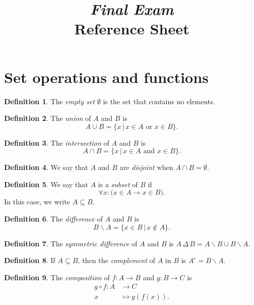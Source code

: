 \documentclass{article}
\title{\emph{\Large Final Exam} \\ Reference Sheet}
\author{}\date{}
\theoremstyle{definition}
\newtheorem{definition}{Definition}
\renewcommand{\subset}{\subseteq}
\begin{document}
\maketitle


\section*{Set operations and functions}

\begin{definition}
	The \emph{empty set} $\emptyset$ is the set that contains no elements. 
\end{definition}

\begin{definition}
	The \emph{union} of $A$ and $B$ is
	\[
		A\cup B = \big\{x \,|\, x\in A \text{ or }x\in B\big\}.
	\]
\end{definition}

\begin{definition}
	The \emph{intersection} of $A$ and $B$ is
	\[
		A\cap B = \big\{x \,|\, x\in A \text{ and }x\in B\big\}.
	\]
\end{definition}

\begin{definition}
	We say that $A$ and $B$ are \emph{disjoint} when $A\cap B=\emptyset$.
\end{definition}

\begin{definition}
	We say that $A$ is a \emph{subset} of $B$ if
	\[
		\forall x : \big(x\in A \to x\in B\big).
	\]
	In this case, we write $A\subset B$.
\end{definition}

\begin{definition}
	The \emph{difference} of $A$ and $B$ is
	\[
		B\backslash A = \{x\in B \,|\, x\notin A\}.
	\]
\end{definition}

\begin{definition}
	The \emph{symmetric difference} of $A$ and $B$ is $A\,\Delta\, B = A\backslash B \cup B\backslash A$.
\end{definition}

\begin{definition}
	If $A\subset B$, then the \emph{complement} of $A$ in $B$ is $A^c=B\backslash A$.
\end{definition}

\begin{definition}
	The \emph{composition} of $f:A\to B$ and $g:B\to C$ is
	\begin{align*}
		g\circ f:	A	&\to		C	\\
				x	&\mapsto	g(f(x)).
	\end{align*}
\end{definition}
\end{document}
